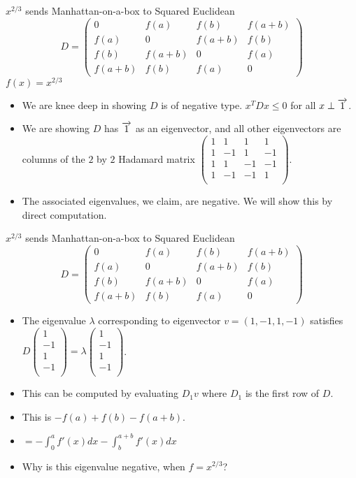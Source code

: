 \begin{frame}{$x^{2/3}$ sends Manhattan-on-a-box to Squared Euclidean}
  \[ D = \begin{pmatrix}
  0 & f(a) & f(b) & f(a+b)\\
  f(a) & 0 & f(a+b) & f(b)\\
  f(b) & f(a+b) & 0 & f(a)\\
  f(a+b) & f(b) & f(a) & 0
  \end{pmatrix}
  \]
  $f(x)=x^{2/3}$
  \begin{itemize}[<+->]
  \item We are knee deep in showing $D$ is of negative type. $x^T D x
  \leq 0$ for all $x \perp \overrightarrow{1}$.
  \item We are showing $D$ has $\overrightarrow{1}$ as an eigenvector, and all other
  eigenvectors are columns of the $2$ by $2$ Hadamard matrix 
  $ \begin{pmatrix}
  1 & 1 & 1 & 1 \\
  1 & -1 & 1 & -1 \\
  1 & 1 & -1 & -1 \\
  1 & -1 & -1 & 1 \\
  \end{pmatrix}
 $. 
 \item
  The associated eigenvalues, we claim, are negative. We will show this
  by direct computation.
  \end{itemize}
\end{frame}

\begin{frame}{$x^{2/3}$ sends Manhattan-on-a-box to Squared Euclidean}
  \[ D = \begin{pmatrix}
  0 & f(a) & f(b) & f(a+b)\\
  f(a) & 0 & f(a+b) & f(b)\\
  f(b) & f(a+b) & 0 & f(a)\\
  f(a+b) & f(b) & f(a) & 0
  \end{pmatrix}
  \]
  \begin{itemize}[<+->]
  \item The eigenvalue $\lambda$ corresponding to eigenvector $v = (1, -1, 1, -1)$
  satisfies
  $D 
  \begin{pmatrix}
  1 \\
  -1\\
  1 \\
  -1\\
  \end{pmatrix} 
  = \lambda 
  \begin{pmatrix}
  1 \\
  -1\\
  1 \\
  -1\\
  \end{pmatrix} 
  $.
  \item This can be computed by evaluating $D_1v$ where $D_1$ is the
  first row of $D$.
  \item This is $-f(a) + f(b) -f(a+b)$.
  \item $= -\int_0^a f'(x)dx  -\int_b^{a+b} f'(x)dx$
  \item Why is this eigenvalue negative, when $f = x^{2/3}$?
  \end{itemize}
\end{frame}

